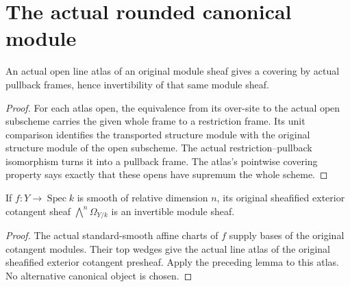 \section{The actual rounded canonical module}

\begin{lemma}
\label{lem:canonical-line-atlas-native-invertible}
\leanok
An actual open line atlas of an original module sheaf gives a covering by
actual pullback frames, hence invertibility of that same module sheaf.
\end{lemma}
\begin{proof}
For each atlas open, the equivalence from its over-site to the actual open
subscheme carries the given whole frame to a restriction frame. Its unit
comparison identifies the transported structure module with the original
structure module of the open subscheme. The actual restriction--pullback
isomorphism turns it into a pullback frame. The atlas's pointwise covering
property says exactly that these opens have supremum the whole scheme.
\end{proof}

\begin{theorem}
\label{thm:canonical-original-native-invertible}
\leanok
If $f:Y\to\operatorname{Spec}k$ is smooth of relative dimension $n$, its
original sheafified exterior cotangent sheaf $\bigwedge^n\Omega_{Y/k}$ is
an invertible module sheaf.
\end{theorem}
\begin{proof}
The actual standard-smooth affine charts of $f$ supply bases of the
original cotangent modules. Their top wedges give the actual line atlas
of the original sheafified exterior cotangent presheaf. Apply the preceding
lemma to this atlas. No alternative canonical object is chosen.
\end{proof}

